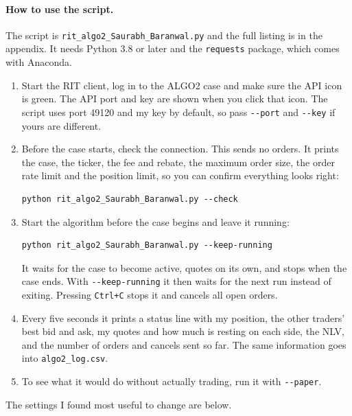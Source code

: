 \documentclass{article}
\begin{document}
\paragraph{How to use the script.}
The script is \texttt{rit\_algo2\_Saurabh\_Baranwal.py} and the full listing is in the appendix. It needs Python 3.8 or later and the \texttt{requests} package, which comes with Anaconda.
\begin{enumerate}
  \item Start the RIT client, log in to the ALGO2 case and make sure the API icon is green. The API port and key are shown when you click that icon. The script uses port 49120 and my key by default, so pass \texttt{-{}-port} and \texttt{-{}-key} if yours are different.
  \item Before the case starts, check the connection. This sends no orders. It prints the case, the ticker, the fee and rebate, the maximum order size, the order rate limit and the position limit, so you can confirm everything looks right:
\begin{verbatim}
python rit_algo2_Saurabh_Baranwal.py --check
\end{verbatim}
  \item Start the algorithm before the case begins and leave it running:
\begin{verbatim}
python rit_algo2_Saurabh_Baranwal.py --keep-running
\end{verbatim}
  It waits for the case to become active, quotes on its own, and stops when the case ends. With \texttt{-{}-keep-running} it then waits for the next run instead of exiting. Pressing \texttt{Ctrl+C} stops it and cancels all open orders.
  \item Every five seconds it prints a status line with my position, the other traders' best bid and ask, my quotes and how much is resting on each side, the NLV, and the number of orders and cancels sent so far. The same information goes into \texttt{algo2\_log.csv}.
  \item To see what it would do without actually trading, run it with \texttt{-{}-paper}.
\end{enumerate}

\noindent The settings I found most useful to change are below.
\end{document}
